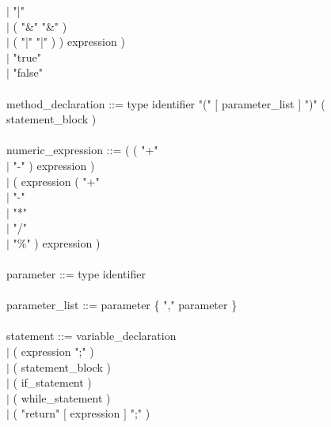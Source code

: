\documentclass[10pt,a4paper,titlepage]{article}
\begin{document}
\begin{ttfamily}
				\hspace*{7.5cm}$\mid$ "|" \\
				\hspace*{7.5cm}$\mid$ ( "\&" "\&" )\\ 
				\hspace*{7.5cm}$\mid$ ( "|" "|" ) ) expression )\\
		\hspace*{4.5cm}$\mid$ "true" \\
		\hspace*{4.5cm}$\mid$ "false" \\
\\		
method\_declaration ::= type identifier "(" $[$ parameter\_list $]$ ")" ( statement\_block )\\
\\
numeric\_expression ::= ( ( "+" \\
			\hspace*{5.3cm}$\mid$ "-" ) expression ) \\
			\hspace*{4.5cm}$\mid$ ( expression ( "+" \\
				\hspace*{7.7cm}$\mid$ "-" \\
				\hspace*{7.7cm}$\mid$ "*" \\
				\hspace*{7.7cm}$\mid$ "/" \\
				\hspace*{7.7cm}$\mid$ "\%" ) expression ) \\
\\								
parameter ::= type identifier \\
\\
parameter\_list ::= parameter \{ "," parameter \} \\
\\
statement ::= variable\_declaration \\
		\hspace*{3cm}$\mid$ ( expression ";" ) \\
		\hspace*{3cm}$\mid$ ( statement\_block ) \\
		\hspace*{3cm}$\mid$ ( if\_statement ) \\
		\hspace*{3cm}$\mid$ ( while\_statement ) \\
		\hspace*{3cm}$\mid$ ( "return" $[$ expression $]$ ";" ) \\

\end{ttfamily}
\end{document}
